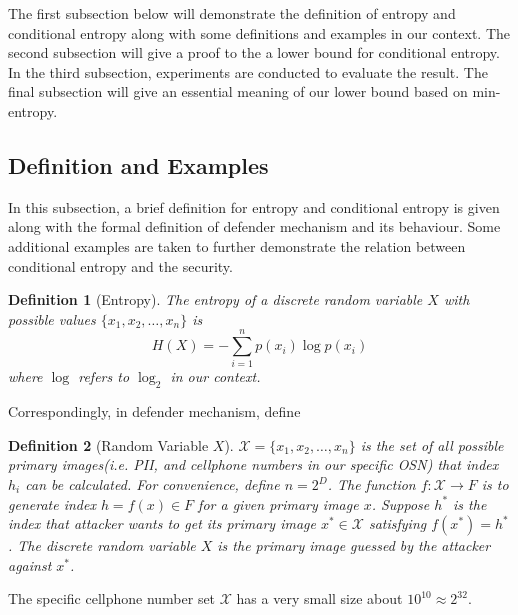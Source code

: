 \documentclass[10pt, conference, compsocconf]{IEEEtran}
\newtheorem{mydef}{Definition}
\begin{document}
    The first subsection below will demonstrate the definition
    of entropy and conditional entropy along with some
    definitions and examples in our context. The second subsection
    will give a proof to the a lower bound for conditional entropy.
    In the third subsection, experiments
    are conducted to evaluate the result. The final subsection
    will give an essential meaning of our lower bound based on min-entropy.

    \subsection{Definition and Examples}
        In this subsection, a brief definition for entropy and conditional
        entropy is given along with the formal definition of defender mechanism
        and its behaviour.
        Some additional examples are taken to further
        demonstrate the relation between conditional entropy and
        the security.

        \begin{mydef}[Entropy]\label{def_entropy}
            The entropy of a discrete random variable $X$ with
            possible values $\{x_1, x_2, \ldots, x_n\}$ is
            \begin{equation}
                H(X) = -\sum_{i=1}^n p(x_i)\log p(x_i)
            \end{equation}
            where $\log$ refers to $\log_2$ in our context.
        \end{mydef}

        Correspondingly, in defender mechanism, define
        \begin{mydef}[Random Variable $X$]\label{def2}
            $\mathcal{X} = \{x_1, x_2, \ldots, x_n\}$ is the set of all possible
            primary images(i.e. PII, and cellphone numbers
            in our specific OSN) that index $h_i$ can be calculated.
            For convenience, define $n = 2^D$.
            The function $f: \mathcal X \rightarrow F$ is to generate index $h = f(x) \in F$ for
            a given primary image $x$.
            Suppose $h^*$ is the index that attacker wants to
            get its primary image $x^* \in \mathcal{X}$ satisfying $f(x^*) = h^*$.
            The discrete random variable $X$ is the
            primary image guessed by the attacker against $x^*$.
        \end{mydef}
        The specific cellphone number set $\mathcal X$ has a very small
        size about $10^{10} \approx 2^{32}$.
\end{document}
